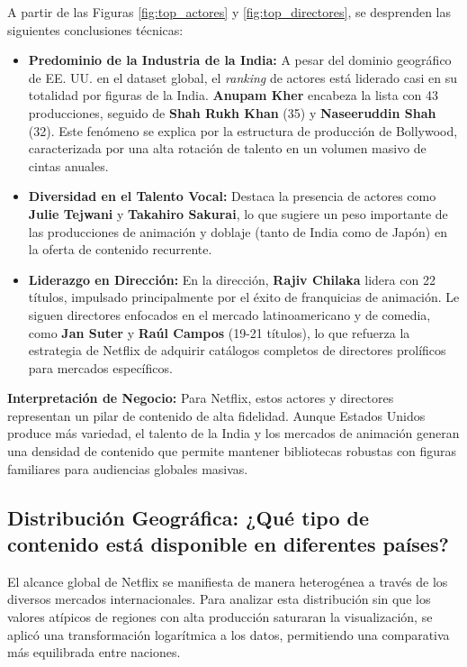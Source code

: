 \documentclass[12pt]{article}
\begin{document}
A partir de las Figuras \ref{fig:top_actores} y \ref{fig:top_directores}, se desprenden las siguientes conclusiones técnicas:

\begin{itemize}
    \item \textbf{Predominio de la Industria de la India:} A pesar del dominio geográfico de EE. UU. en el dataset global, el \textit{ranking} de actores está liderado casi en su totalidad por figuras de la India. \textbf{Anupam Kher} encabeza la lista con 43 producciones, seguido de \textbf{Shah Rukh Khan} (35) y \textbf{Naseeruddin Shah} (32). Este fenómeno se explica por la estructura de producción de Bollywood, caracterizada por una alta rotación de talento en un volumen masivo de cintas anuales.
    \item \textbf{Diversidad en el Talento Vocal:} Destaca la presencia de actores como \textbf{Julie Tejwani} y \textbf{Takahiro Sakurai}, lo que sugiere un peso importante de las producciones de animación y doblaje (tanto de India como de Japón) en la oferta de contenido recurrente.
    \item \textbf{Liderazgo en Dirección:} En la dirección, \textbf{Rajiv Chilaka} lidera con 22 títulos, impulsado principalmente por el éxito de franquicias de animación. Le siguen directores enfocados en el mercado latinoamericano y de comedia, como \textbf{Jan Suter} y \textbf{Raúl Campos} (19-21 títulos), lo que refuerza la estrategia de Netflix de adquirir catálogos completos de directores prolíficos para mercados específicos.
\end{itemize}

\textbf{Interpretación de Negocio:} Para Netflix, estos actores y directores representan un pilar de contenido de alta fidelidad. Aunque Estados Unidos produce más variedad, el talento de la India y los mercados de animación generan una densidad de contenido que permite mantener bibliotecas robustas con figuras familiares para audiencias globales masivas.

\subsection{Distribución Geográfica: ¿Qué tipo de contenido está disponible en diferentes países?}

El alcance global de Netflix se manifiesta de manera heterogénea a través de los diversos mercados internacionales. Para analizar esta distribución sin que los valores atípicos de regiones con alta producción saturaran la visualización, se aplicó una transformación logarítmica a los datos, permitiendo una comparativa más equilibrada entre naciones.
\end{document}
